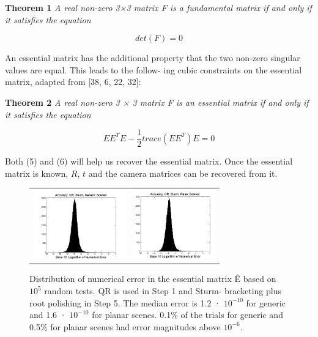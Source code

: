 \documentclass[10pt,twocolumn,letterpaper]{article}
\begin{document}
\textbf{Theorem 1}\textit{ A real non-zero 3×3 matrix F is a fundamental
matrix if and only if it satisfies the equation}

\begin{equation}
    det\left(F\right)=0
    \label{eq:eq5}
\end{equation}

An essential matrix has the additional property that the two
non-zero singular values are equal. This leads to the follow-
ing cubic constraints on the essential matrix, adapted from
[38, 6, 22, 32]:

\textbf{Theorem 2}\textit { A real non-zero 3 × 3 matrix F is an essential
matrix if and only if it satisfies the equation}

\begin{equation}
    EE^TE-\frac{1}{2}trace\left(EE^T\right)E=0
    \label{eq:eq6}
\end{equation}

Both (5) and (6) will help us recover the essential matrix.
Once the essential matrix is known, $R$, $t$ and the camera
matrices can be recovered from it.


\begin{figure}[H]
    \centering
    \begin{tabular}{cc}
         \includegraphics[width=4cm]{images/im1.png} &  
         \includegraphics[width=3.5cm]{images/im2.png}  
    \end{tabular}
    \caption{ Distribution of numerical error in the essential matrix
Ê based on $10^5$ random tests. QR is used in Step 1 and Sturm-
bracketing plus root polishing in Step 5. The median error is 1.2 ·
$10^{−10}$ for generic and 1.6 · $10^{−10}$ for planar scenes. 0.1\% of the
trials for generic and 0.5\% for planar scenes had error magnitudes
above $10^{-6}$.}
    \label{fig:fig1}
\end{figure}




\end{document}
